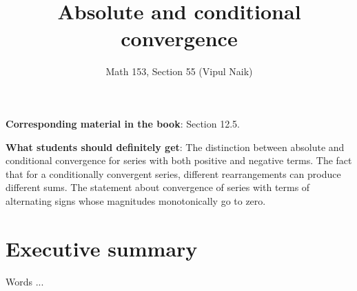 \documentclass[10pt]{amsart}
\title{Absolute and conditional convergence}
\author{Math 153, Section 55 (Vipul Naik)}
\begin{document}
\maketitle

{\bf Corresponding material in the book}: Section 12.5.

{\bf What students should definitely get}: The distinction between
absolute and conditional convergence for series with both positive and
negative terms. The fact that for a conditionally convergent series,
different rearrangements can produce different sums. The statement
about convergence of series with terms of alternating signs whose
magnitudes monotonically go to zero.

\section*{Executive summary}

Words ...
\end{document}
